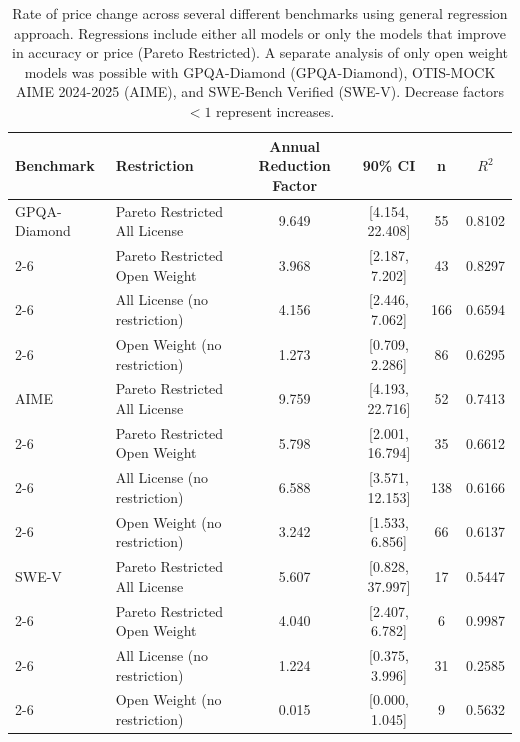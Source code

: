 \renewcommand{\arraystretch}{1.2}

\begin{table}[h!]
\centering
\caption{Rate of price change across several different benchmarks using general regression approach. Regressions include either all models or only the models that improve in accuracy or price (Pareto Restricted). A separate analysis of only open weight models was possible with GPQA-Diamond (GPQA-Diamond), OTIS-MOCK AIME 2024-2025 (AIME), and SWE-Bench Verified (SWE-V). Decrease factors $<1$ represent increases.}
\label{tab:regression_results}

\begin{tabular}{|l|l|c|c|c|c|}
\hline
\textbf{Benchmark} & \textbf{Restriction} & \textbf{Annual Reduction Factor} & \textbf{90\% CI} & \textbf{n} & \textbf{$R^2$} \\
\hline

GPQA-Diamond & Pareto Restricted All License & 9.649 & [4.154, 22.408] & 55 & 0.8102 \\ \cline{2-6}
\rowcolor{restrgray} \cellcolor{white} & Pareto Restricted Open Weight & 3.968 & [2.187, 7.202] & 43 & 0.8297 \\ \cline{2-6}
\cellcolor{white} & All License (no restriction) & 4.156 & [2.446, 7.062] & 166 & 0.6594 \\ \cline{2-6}
\rowcolor{restrgray} \cellcolor{white} & Open Weight (no restriction) & 1.273 & [0.709, 2.286] & 86 & 0.6295 \\
\hline

AIME & Pareto Restricted All License & 9.759 & [4.193, 22.716] & 52 & 0.7413 \\ \cline{2-6}
\rowcolor{restrgray} \cellcolor{white} & Pareto Restricted Open Weight & 5.798 & [2.001, 16.794] & 35 & 0.6612 \\ \cline{2-6}
\cellcolor{white} & All License (no restriction) & 6.588 & [3.571, 12.153] & 138 & 0.6166 \\ \cline{2-6}
\rowcolor{restrgray} \cellcolor{white} & Open Weight (no restriction) & 3.242 & [1.533, 6.856] & 66 & 0.6137 \\
\hline

SWE\mbox{-}V & Pareto Restricted All License & 5.607 & [0.828, 37.997] & 17 & 0.5447 \\ \cline{2-6}
\rowcolor{restrgray} \cellcolor{white} & Pareto Restricted Open Weight & 4.040 & [2.407, 6.782] & 6 & 0.9987 \\ \cline{2-6}
\cellcolor{white} & All License (no restriction) & 1.224 & [0.375, 3.996] & 31 & 0.2585 \\ \cline{2-6}
\rowcolor{restrgray} \cellcolor{white} & Open Weight (no restriction) & 0.015 & [0.000, 1.045] & 9 & 0.5632 \\
\hline

\end{tabular}
\end{table}
